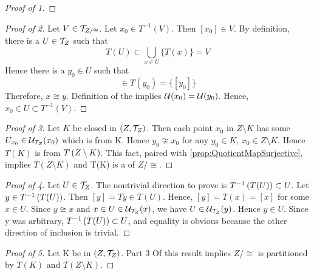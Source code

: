 \begin{prop}
\begin{proof}[Proof of 1]
    \end{proof}
    \begin{proof}[Proof of 2]
        Let $V \in \mathcal{T}_{Z/\cong}$. 
        Let $x_0 \in T^{-1}(V)$. 
        Then $[x_0] \in V$. 
        By definition, there is a $U \in \mathcal{T}_Z$ such that 
        \begin{equation}
            T(U) \subset \bigcup\limits_{x \in U} \{T(x)\}=V
        \end{equation}
        Hence there is a $y_0 \in U$  such that 
        \begin{equation}
            [x_0] \in T(y_0) = \{[y_0]\}
        \end{equation}
        Therefore, $x \cong y$. 
        Definition of the 
		\RelationOfEqualNeighborhoodFilters 
		implies $\mathcal{U}(x_0)=\mathcal{U}(y_0)$. 
        Hence, $x_0 \in U \subset T^{-1}(V)$.
    \end{proof}
    \begin{proof}[Proof of 3]
        Let $K$ be closed in $(Z,\mathcal{T}_Z)$. 
        Then each point $x_0$ in $Z\setminus K$ has some $U_{x_0} \in \mathcal{U}_{\mathcal{T}_Z}(x_0)$ which is 
		\Disjoint 
		from K.
        Hence $y_0 \not \cong x_0$ for any $y_0 \in K$, $x_0 \in Z\setminus K$. 
        Hence $T(K)$ is 
		\Disjoint 
		from $T\left( Z \setminus K\right)$. 
        This fact, paired with \ref{prop:QuotientMapSurjective}, implies $T(Z\setminus K)$ and T(K) 
		is a \Partition of $Z/\cong$.
    \end{proof}
    \begin{proof}[Proof of 4]
        Let $U \in \mathcal{T}_Z$. 
        The nontrivial direction to prove is $T^{-1}\left( T(U)\right) \subset U$.
        Let $y \in T^{-1}\left( T(U)\right)$. 
        Then $[y]=Ty \in T(U)$.
        Hence, $[y]=T(x)=[x]$ for some $x \in U$. 
        Since $y \cong x$ and $x \in U \in \mathcal{U}_{\mathcal{T}_Z}(x)$, we have $U \in \mathcal{U}_{\mathcal{T}_Z}(y)$. 
        Hence $y \in U$.
        Since y was arbitrary, $T^{-1}\left( T(U)\right) \subset U$, and equality is obvious because the other direction of inclusion is trivial. 
    \end{proof}
    \begin{proof}[Proof of 5]
        Let K be 
		\SetClosed 
		in $(Z,\mathcal{T}_Z)$. Part 3 Of this result implies $Z/\cong$ is partitioned by $T(K)$ and $T(Z\setminus K)$. 
        

\end{proof}
\end{prop}
